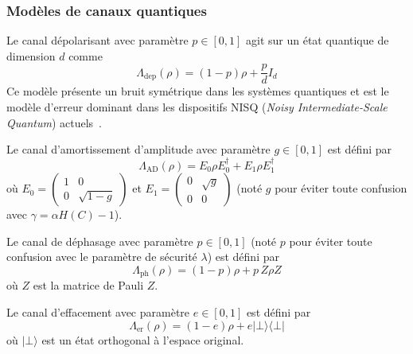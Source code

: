 \begin{sloppypar}
\subsubsection{Mod\`eles de canaux quantiques}
\label{subsubsec:modeles_canaux}

\begin{definition}\label{def:canal_depolarisant}
Le canal d\'epolarisant avec param\`etre $p \in [0, 1]$ agit sur un \'etat
quantique de dimension $d$ comme
\begin{equation}
\Lambda_{\text{dep}}(\rho) = (1-p)\rho + \frac{p}{d} I_d
\end{equation}
Ce mod\`ele pr\'esente un bruit sym\'etrique dans les syst\`emes quantiques et
est le mod\`ele d'erreur dominant dans les dispositifs NISQ (\emph{Noisy Intermediate-Scale Quantum}) actuels~\cite{Preskill2018,Bharti2022}.
\end{definition}

\begin{definition}\label{def:canal_amortissement}
Le canal d'amortissement d'amplitude avec param\`etre $g \in [0, 1]$ est d\'efini par
\begin{equation}
\Lambda_{\text{AD}}(\rho) = E_0 \rho E_0^\dagger + E_1 \rho E_1^\dagger
\end{equation}
o\`u $E_0 = \begin{pmatrix} 1 & 0 \\ 0 & \sqrt{1-g} \end{pmatrix}$ et
$E_1 = \begin{pmatrix} 0 & \sqrt{g} \\ 0 & 0 \end{pmatrix}$ (not\'e $g$ pour \'eviter
toute confusion avec $\gamma = \alpha H(C) - 1$).
\end{definition}

\begin{definition}\label{def:canal_dephasage}
Le canal de d\'ephasage avec param\`etre $p \in [0, 1]$ (not\'e $p$ pour \'eviter
toute confusion avec le param\`etre de s\'ecurit\'e $\lambda$) est d\'efini par
\begin{equation}
\Lambda_{\text{ph}}(\rho) = (1-p)\rho + p\, Z \rho Z
\end{equation}
o\`u $Z$ est la matrice de Pauli $Z$.
\end{definition}

\begin{definition}\label{def:canal_effacement}
Le canal d'effacement avec param\`etre $e \in [0, 1]$ est d\'efini par
\begin{equation}
\Lambda_{\text{er}}(\rho) = (1-e)\rho + e |\bot\rangle\langle\bot|
\end{equation}
o\`u $|\bot\rangle$ est un \'etat orthogonal \`a l'espace original.
\end{definition}


\end{sloppypar}
